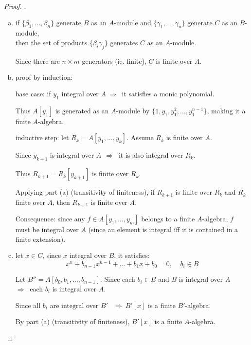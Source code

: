 \documentclass{article}
\theoremstyle{definition}
\begin{document}
\begin{proof}.\\
  \begin{enumerate}[a.]
    \item if $\{ \beta_1, \ldots, \beta_n \}$ generate $B$ as an $A$-module and $\{ \gamma_1, \ldots, \gamma_n \}$ generate $C$ as an $B$-module,\\
      then the set of products $\{ \beta_i \gamma_j \}$ generates $C$ as an $A$-module.

      Since there are $n \times m$ generators (ie. finite), $C$ is finite over $A$.

    \item proof by induction:

      base case: if $y_1$ integral over $A ~\Longrightarrow~$ it satisfies a monic polynomial.

      Thus $A[y_1]$ is generated as an $A$-module by $\{1, y_1, y_1^2, \ldots, y_1^{n-1} \}$, making it a finite $A$-algebra.

      inductive step: let $R_k = A[y_1, \ldots, y_k]$. Assume $R_k$ is finite over $A$.

      Since $y_{k+1}$ is integral over $A~~ \Longrightarrow~$ it is also integral over $R_k$.

      Thus $R_{k+1} = R_k[y_{k+1}]$ is finite over $R_k$.

      Applying part (a) (transitivity of finiteness), if $R_{k+1}$ is finite over $R_k$ and $R_k$ finite over $A$, then $R_{k+1}$ is finite over $A$.

      Consequence: since any $f \in A[y_1, \ldots, y_m]$ belongs to a finite $A$-algebra, $f$ must be integral over $A$ (since an element is integral iff it is contained in a finite extension).

    \item let $x \in C$, since $x$ integral over $B$, it satisfies:
      $$x^n + b_{n-1} x^{n-1} + \ldots + b_1 x + b_0 = 0,~~~~~b_i \in B$$

      Let $B''=A[b_0, b_1, \ldots, b_{n-1}]$. Since each $b_i \in B$ and $B$ is integral over $A$\\
      \hspace*{2em} $\Longrightarrow~$ each $b_i$ is integral over $A$.

      Since all $b_i$ are integral over $B'$ $~~\Longrightarrow~ B'[x]$ is a finite $B'$-algebra.

      By part (a) (transitivity of finiteness), $B'[x]$ is a finite $A$-algebra.


\end{enumerate}
\end{proof}
\end{document}
